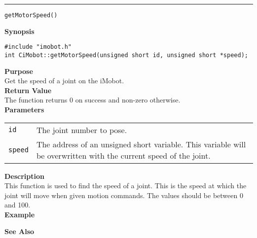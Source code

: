 \noindent
\vspace{5pt}
\rule{6.5in}{0.015in}
\noindent
{\LARGE \texttt{getMotorSpeed()}}\\
{}

\noindent
{\bf Synopsis}\\
\begin{verbatim}
#include "imobot.h"
int CiMobot::getMotorSpeed(unsigned short id, unsigned short *speed);
\end{verbatim}

\noindent
{\bf Purpose}\\
Get the speed of a joint on the iMobot.\\

\noindent
{\bf Return Value}\\
The function returns 0 on success and non-zero otherwise.\\

\noindent
{\bf Parameters}
\vspace{-0.1in}
\begin{description}
\item               
\begin{tabular}{p{10 mm}p{145 mm}}
\texttt{id} & The joint number to pose. \\
\texttt{speed} & The address of an unsigned short variable. This variable will be overwritten
with the current speed of the joint.
\end{tabular}
\end{description}

\noindent
{\bf Description}\\
This function is used to find the speed of a joint.  This is the speed at which the joint will move when given motion commands. The values should be between 0 and 100. \\

\noindent
{\bf Example}\\
\noindent

\noindent
{\bf See Also}\\

